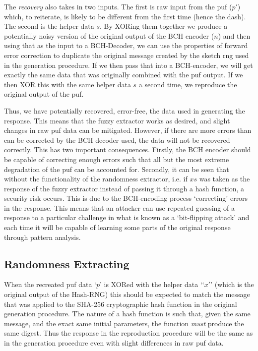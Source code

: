 The \emph{recovery} also takes in two inputs. The first is raw input from the \gls{puf} ($p'$)
which, to reiterate, is likely to be different from the first time (hence the dash).
The second is the helper data $s$. By XORing them together we produce a potentially
noisy version of the original output of the BCH encoder ($n$) and then using that
as the input to a BCH-Decoder, we can use the properties of forward error
correction to duplicate the original message created by the sketch \gls{rng} used in the
generation procedure.
If we then pass that into a BCH-encoder, we will get exactly the same data that
was originally combined with the \gls{puf} output.
If we then XOR this with the same helper data $s$ a second time, we reproduce the
original output of the \gls{puf}.

Thus, we have potentially recovered, error-free, the data used in generating the
response. This means that the fuzzy extractor works as desired, and slight changes
in raw \gls{puf} data can be mitigated. However, if there are more errors than can be
corrected by the BCH decoder used, the data will not be recovered correctly.
This has two important consequences. Firstly, the BCH encoder should be capable
of correcting enough errors such that all but the most extreme degradation of
the \gls{puf} can be accounted for. Secondly, it can be seen that without the
functionality of the randomness extractor, i.e. if $xs$ was taken as the response
 of the fuzzy extractor instead of passing it through a hash function, a
security risk occurs. This is due to the BCH-encoding process `correcting' errors in the response.
This means that an attacker can use repeated guessing of a response to a
particular challenge in what is known as a `bit-flipping attack'
 and each time it will be capable of learning some parts
of the original response through pattern analysis.

\subsection{Randomness Extracting}

When the recreated \gls{puf} data `$p$' is XORed with the helper data `$x'$'
(which is the original output of the Hash-RNG) this should
be expected to match the message that was applied to the SHA-256 cryptographic
hash function in the original generation procedure.
The nature of a hash function is such that, given the same message, and the
exact same initial parameters, the function
\emph{must} produce the same digest.
Thus the response in the reproduction procedure will be the same as in the
generation procedure even with slight differences in raw \gls{puf} data.

